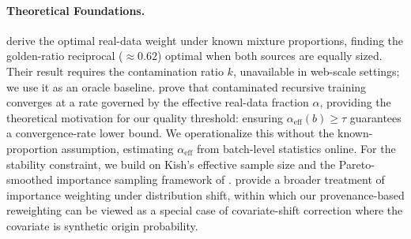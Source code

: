 \paragraph{Theoretical Foundations.}
\citet{he_2025_golden_ratio} derive the optimal real-data weight under known mixture proportions, finding the golden-ratio reciprocal (${\approx}0.62$) optimal when both sources are equally sized.
Their result requires the contamination ratio $k$, unavailable in web-scale settings; we use it as an oracle baseline.
\citet{wang_2026_survive_contamination} prove that contaminated recursive training converges at a rate governed by the effective real-data fraction $\alpha$, providing the theoretical motivation for our quality threshold: ensuring $\alpha_{\mathrm{eff}}(b) \geq \tau$ guarantees a convergence-rate lower bound.
We operationalize this without the known-proportion assumption, estimating $\alpha_{\mathrm{eff}}$ from batch-level statistics online.
For the stability constraint, we build on Kish's effective sample size and the Pareto-smoothed importance sampling framework of \citet{vehtari_2024_psis}.
\citet{kimura_2024_iw_survey} provide a broader treatment of importance weighting under distribution shift, within which our provenance-based reweighting can be viewed as a special case of covariate-shift correction where the covariate is synthetic origin probability.
